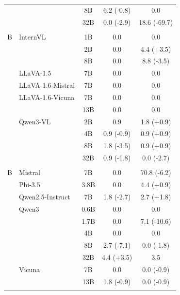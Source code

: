 \begin{table}[t]
{\begin{tabular}{llc|cc}
 &  & 8B & 6.2 \textcolor{[HTML]{CC7A00}}{(-0.8)} & 0.0 \\
 &  & 32B & 0.0 \textcolor{[HTML]{CC7A00}}{(-2.9)} & 18.6 \textcolor{[HTML]{CC7A00}}{(-69.7)} \\
\addlinespace[1pt]
\multicolumn{5}{l}{VLM Backbone Decoders} \\
B & InternVL & 1B & 0.0 & 0.0 \\
 &  & 2B & 0.0 & 4.4 \textcolor{[HTML]{0072B2}}{(+3.5)} \\
 &  & 8B & 0.0 & 8.8 \textcolor{[HTML]{CC7A00}}{(-3.5)} \\
 & LLaVA-1.5 & 7B & 0.0 & 0.0 \\
 & LLaVA-1.6-Mistral & 7B & 0.0 & 0.0 \\
 & LLaVA-1.6-Vicuna & 7B & 0.0 & 0.0 \\
 &  & 13B & 0.0 & 0.0 \\
 & Qwen3-VL & 2B & 0.9 & 1.8 \textcolor{[HTML]{0072B2}}{(+0.9)} \\
 &  & 4B & 0.9 \textcolor{[HTML]{CC7A00}}{(-0.9)} & 0.9 \textcolor{[HTML]{0072B2}}{(+0.9)} \\
 &  & 8B & 1.8 \textcolor{[HTML]{CC7A00}}{(-3.5)} & 0.9 \textcolor{[HTML]{0072B2}}{(+0.9)} \\
 &  & 32B & 0.9 \textcolor{[HTML]{CC7A00}}{(-1.8)} & 0.0 \textcolor{[HTML]{CC7A00}}{(-2.7)} \\
\addlinespace[1pt]
\multicolumn{5}{l}{Standalone LLMs} \\
B & Mistral & 7B & 0.0 & 70.8 \textcolor{[HTML]{CC7A00}}{(-6.2)} \\
 & Phi-3.5 & 3.8B & 0.0 & 4.4 \textcolor{[HTML]{0072B2}}{(+0.9)} \\
 & Qwen2.5-Instruct & 7B & 1.8 \textcolor{[HTML]{CC7A00}}{(-2.7)} & 2.7 \textcolor{[HTML]{0072B2}}{(+1.8)} \\
 & Qwen3 & 0.6B & 0.0 & 0.0 \\
 &  & 1.7B & 0.0 & 7.1 \textcolor{[HTML]{CC7A00}}{(-10.6)} \\
 &  & 4B & 0.0 & 0.0 \\
 &  & 8B & 2.7 \textcolor{[HTML]{CC7A00}}{(-7.1)} & 0.0 \textcolor{[HTML]{CC7A00}}{(-1.8)} \\
 &  & 32B & 4.4 \textcolor{[HTML]{0072B2}}{(+3.5)} & 3.5 \\
 & Vicuna & 7B & 0.0 & 0.0 \textcolor{[HTML]{CC7A00}}{(-0.9)} \\
 &  & 13B & 1.8 \textcolor{[HTML]{CC7A00}}{(-0.9)} & 0.0 \textcolor{[HTML]{CC7A00}}{(-0.9)} \\
\addlinespace[1pt]

\end{tabular}}
\end{table}
